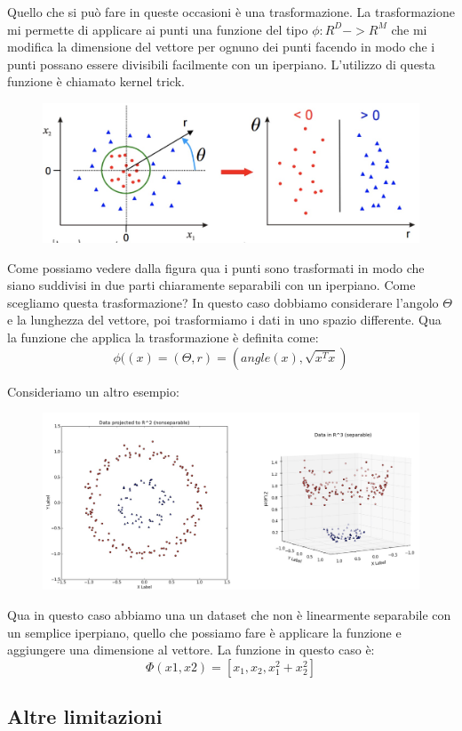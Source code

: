 \documentclass[14pt]{extreport}
\begin{document}
Quello che si può fare in queste occasioni è una trasformazione. La trasformazione mi permette di applicare ai punti una funzione del tipo $\phi: R^D
-> R^M$ che mi modifica la dimensione del vettore per ognuno dei punti facendo in modo che i punti possano essere divisibili facilmente con un
iperpiano. L'utilizzo di questa funzione è chiamato kernel trick.

\begin{figure}[H]
\centering
\includegraphics[width=0.6\linewidth]{154.jpeg}
\end{figure}

Come possiamo vedere dalla figura qua i punti sono trasformati in modo che siano suddivisi in due parti chiaramente separabili con un iperpiano. Come
scegliamo questa trasformazione? In questo caso dobbiamo considerare l'angolo $\Theta$ e la lunghezza del vettore, poi trasformiamo i dati in uno
spazio differente. Qua la funzione che applica la trasformazione è definita come: $$\phi((x) = (\Theta, r) = (angle(x), \sqrt{x^Tx})$$


Consideriamo un altro esempio:
\begin{figure}[H]
\centering
\includegraphics[width=0.7\linewidth]{155.jpeg}
\end{figure}
Qua in questo caso abbiamo una un dataset che non è linearmente separabile con un semplice iperpiano, quello che possiamo fare è applicare la funzione
e aggiungere una dimensione al vettore. La funzione in questo caso è: $$\Phi(x1,x2) = [x_1,x_2,x_1^2+x_2^2]$$


\subsection{Altre limitazioni}
\end{document}

